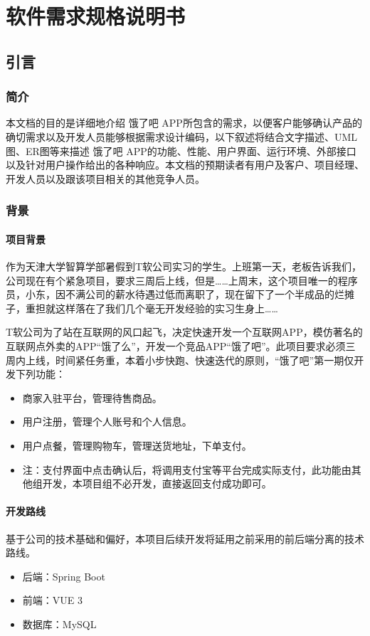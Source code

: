 \chapter{软件需求规格说明书}

\section{引言}

\subsection{简介}

本文档的目的是详细地介绍 饿了吧 APP所包含的需求，以便客户能够确认产品的确切需求以及开发人员能够根据需求设计编码，以下叙述将结合文字描述、UML图、ER图等来描述 饿了吧 APP的功能、性能、用户界面、运行环境、外部接口以及针对用户操作给出的各种响应。本文档的预期读者有用户及客户、项目经理、开发人员以及跟该项目相关的其他竞争人员。

\subsection{背景}
\subsubsection{项目背景}
作为天津大学智算学部暑假到T软公司实习的学生。上班第一天，老板告诉我们，公司现在有个紧急项目，要求三周后上线，但是……上周末，这个项目唯一的程序员，小东，因不满公司的薪水待遇过低而离职了，现在留下了一个半成品的烂摊子，重担就这样落在了我们几个毫无开发经验的实习生身上……


T软公司为了站在互联网的风口起飞，决定快速开发一个互联网APP，模仿著名的互联网点外卖的APP“饿了么”，开发一个竞品APP“饿了吧”。此项目要求必须三周内上线，时间紧任务重，本着小步快跑、快速迭代的原则，“饿了吧”第一期仅开发下列功能：
\begin{itemize}
    \item 商家入驻平台，管理待售商品。
    \item 用户注册，管理个人账号和个人信息。
    \item 用户点餐，管理购物车，管理送货地址，下单支付。
    \footnotesize
    \item 注：支付界面中点击确认后，将调用支付宝等平台完成实际支付，此功能由其他组开发，本项目组不必开发，直接返回支付成功即可。
    \normalsize
\end{itemize}

\subsubsection{开发路线}
基于公司的技术基础和偏好，本项目后续开发将延用之前采用的前后端分离的技术路线。
\begin{itemize}
    \item 后端：Spring Boot
    \item 前端：VUE 3
    \item 数据库：MySQL
\end{itemize}
